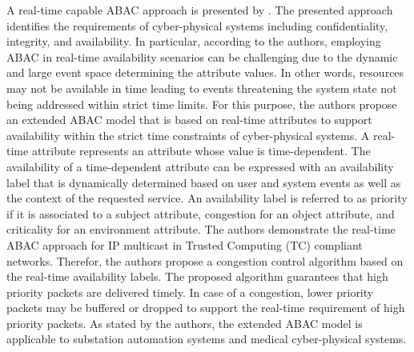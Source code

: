 A real-time capable ABAC approach is presented by \citeauthor{Burmester2013} \cite{Burmester2013}.
The presented approach identifies the requirements of cyber-physical systems including confidentiality, integrity, and availability.
In particular, according to the authors, employing ABAC in real-time availability scenarios can be challenging due to the dynamic and large event space determining the attribute values.
In other words, resources may not be available in time leading to events threatening the system state not being addressed within strict time limits.
For this purpose, the authors propose an extended ABAC model that is based on real-time attributes to support availability within the strict time constraints of cyber-physical systems.
A real-time attribute represents an attribute whose value is time-dependent.
The availability of a time-dependent attribute can be expressed with an availability label that is dynamically determined based on user and system events as well as the context of the requested service.
An availability label is referred to as priority if it is associated to a subject attribute, congestion for an object attribute, and criticality for an environment attribute.
The authors demonstrate the real-time ABAC approach for IP multicast in Trusted Computing (TC) compliant networks.
Therefor, the authors propose a congestion control algorithm based on the real-time availability labels.
The proposed algorithm guarantees that high priority packets are delivered timely.
In case of a congestion, lower priority packets may be buffered or dropped to support the real-time requirement of high priority packets.
As stated by the authors, the extended ABAC model is applicable to substation automation systems and medical cyber-physical systems.



